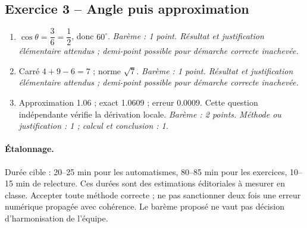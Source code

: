 \subsection*{Exercice 3 -- Angle puis approximation}
\begin{enumerate}
\item $\cos \theta =\dfrac{3}{6}=\dfrac{1}{2}$, donc $60^\circ$. \textit{Barème : 1 point. Résultat et justification élémentaire attendus ; demi-point possible pour démarche correcte inachevée.}
\item Carré $4+9-6=7$ ; norme $\sqrt7$. \textit{Barème : 1 point. Résultat et justification élémentaire attendus ; demi-point possible pour démarche correcte inachevée.}
\item Approximation \num{1,06} ; exact \num{1,0609} ; erreur \num{0,0009}. Cette question indépendante vérifie la dérivation locale. \textit{Barème : 2 points. Méthode ou justification : 1 ; calcul et conclusion : 1.}
\end{enumerate}
\paragraph{Étalonnage.} Durée cible : 20–25 min pour les automatismes, 80–85 min pour les exercices, 10–15 min de relecture. Ces durées sont des estimations éditoriales à mesurer en classe. Accepter toute méthode correcte ; ne pas sanctionner deux fois une erreur numérique propagée avec cohérence. Le barème proposé ne vaut pas décision d’harmonisation de l’équipe.
